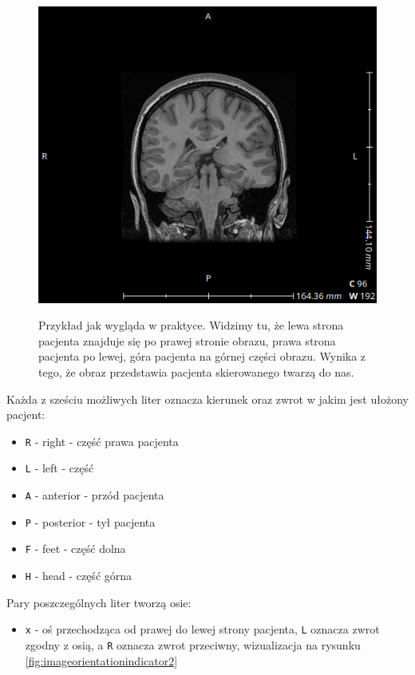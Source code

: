 \begin{itemize}
    \begin{figure}[h]
        \caption{
            Przykład jak wygląda  w praktyce.
            Widzimy tu, że lewa strona pacjenta znajduje się po prawej stronie obrazu, prawa strona pacjenta po lewej, góra pacjenta na górnej części obrazu.
            Wynika z tego, że obraz przedstawia pacjenta skierowanego twarzą do nas.
            }
        \includegraphics[width=\textwidth]{img/imageorientationindicator-002.png}
        \centering
        \label{fig:imageorientationindicator1}
    \end{figure}
    
    
    Każda z sześciu możliwych liter oznacza kierunek oraz zwrot w jakim jest ułożony pacjent:
    \begin{itemize}
        \item \texttt{R} - right - część prawa pacjenta
        \item \texttt{L} - left - część 
        \item \texttt{A} - anterior - przód pacjenta
        \item \texttt{P} - posterior - tył pacjenta
        \item \texttt{F} - feet - część dolna
        \item \texttt{H} - head - część górna
    \end{itemize}

    Pary poszczególnych liter tworzą osie:
    \begin{itemize}
        \item \texttt{x} - oś przechodząca od prawej do lewej strony pacjenta, \texttt{L} oznacza zwrot zgodny z osią, a \texttt{R} oznacza zwrot przeciwny, wizualizacja na rysunku \ref{fig:imageorientationindicator2}


\end{itemize}
\end{itemize}

